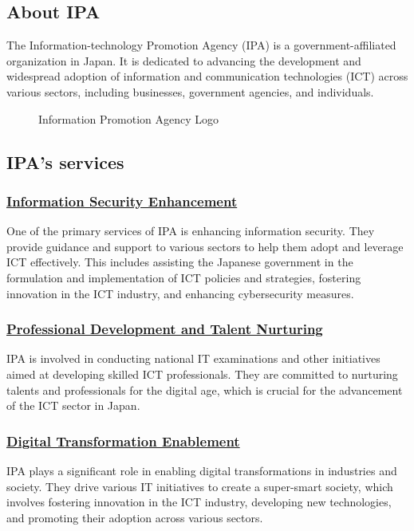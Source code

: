 \subsection{About IPA}
The Information-technology Promotion Agency (IPA) is a government-affiliated organization in Japan. It is dedicated to advancing the development and widespread adoption of information and communication technologies (ICT) across various sectors, including businesses, government agencies, and individuals.
\begin{figure}[H]
    \centering
    \caption{Information Promotion Agency Logo}
    \label{fig:logo-of-IPA}
\end{figure}

\subsection{IPA's services}
\subsubsection*{\underline{Information Security Enhancement}}
One of the primary services of IPA is enhancing information security. They provide guidance and support to various sectors to help them adopt and leverage ICT effectively. This includes assisting the Japanese government in the formulation and implementation of ICT policies and strategies, fostering innovation in the ICT industry, and enhancing cybersecurity measures.

\subsubsection*{\underline{Professional Development and Talent Nurturing}}
IPA is involved in conducting national IT examinations and other initiatives aimed at developing skilled ICT professionals. They are committed to nurturing talents and professionals for the digital age, which is crucial for the advancement of the ICT sector in Japan.

\subsubsection*{\underline{Digital Transformation Enablement}}
IPA plays a significant role in enabling digital transformations in industries and society. They drive various IT initiatives to create a super-smart society, which involves fostering innovation in the ICT industry, developing new technologies, and promoting their adoption across various sectors.

